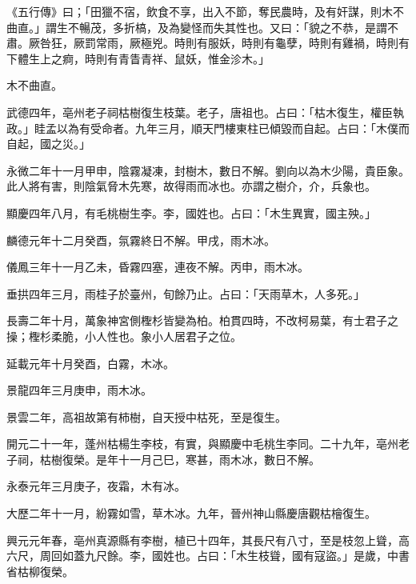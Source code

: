 \begin{pinyinscope}
 《五行傳》曰；「田獵不宿，飲食不享，出入不節，奪民農時，及有奸謀，則木不曲直。」謂生不暢茂，多折槁，及為變怪而失其性也。又曰：「貌之不恭，是謂不肅。厥咎狂，厥罰常雨，厥極兇。時則有服妖，時則有龜孽，時則有雞禍，時則有下體生上之痾，時則有青眚青祥、鼠妖，惟金沴木。」



 木不曲直。



 武德四年，亳州老子祠枯樹復生枝葉。老子，唐祖也。占曰：「枯木復生，權臣執政。」眭孟以為有受命者。九年三月，順天門樓東柱已傾毀而自起。占曰：「木僕而自起，國之災。」



 永微二年十一月甲申，陰霧凝凍，封樹木，數日不解。劉向以為木少陽，貴臣象。此人將有害，則陰氣脅木先寒，故得雨而冰也。亦謂之樹介，介，兵象也。



 顯慶四年八月，有毛桃樹生李。李，國姓也。占曰：「木生異實，國主殃。」



 麟德元年十二月癸酉，氛霧終日不解。甲戌，雨木冰。



 儀鳳三年十一月乙未，昏霧四塞，連夜不解。丙申，雨木冰。



 垂拱四年三月，雨桂子於臺州，旬餘乃止。占曰：「天雨草木，人多死。」



 長壽二年十月，萬象神宮側檉杉皆變為柏。柏貫四時，不改柯易葉，有士君子之操；檉杉柔脆，小人性也。象小人居君子之位。



 延載元年十月癸酉，白霧，木冰。



 景龍四年三月庚申，雨木冰。



 景雲二年，高祖故第有柿樹，自天授中枯死，至是復生。



 開元二十一年，蓬州枯楊生李枝，有實，與顯慶中毛桃生李同。二十九年，亳州老子祠，枯樹復榮。是年十一月己巳，寒甚，雨木冰，數日不解。



 永泰元年三月庚子，夜霜，木有冰。



 大歷二年十一月，紛霧如雪，草木冰。九年，晉州神山縣慶唐觀枯檜復生。



 興元元年春，亳州真源縣有李樹，植已十四年，其長尺有八寸，至是枝忽上聳，高六尺，周回如蓋九尺餘。李，國姓也。占曰：「木生枝聳，國有寇盜。」是歲，中書省枯柳復榮。




\end{pinyinscope}
